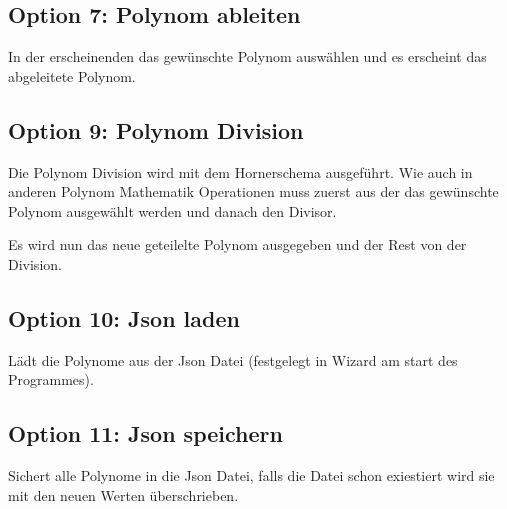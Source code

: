\documentclass[letterpaper,10pt,ngerman]{sphinxmanual}
\begin{document}
\subsection{Option 7: Polynom ableiten}
\label{menu:option-7-polynom-ableiten}
\begin{DUlineblock}{0em}
\item[] In der erscheinenden  das gewünschte Polynom auswählen und es erscheint das abgeleitete Polynom.
\end{DUlineblock}



\subsection{Option 9: Polynom Division}
\label{menu:option-9-polynom-division}
Die Polynom Division wird mit dem Hornerschema ausgeführt. Wie auch in anderen Polynom Mathematik Operationen muss
zuerst aus der  das gewünschte Polynom ausgewählt werden und danach den Divisor.

Es wird nun das neue geteilelte Polynom ausgegeben und der Rest von der Division.



\subsection{Option 10: Json laden}
\label{menu:option-10-json-laden}
Lädt die Polynome aus der Json Datei (festgelegt in Wizard am start des Programmes).



\subsection{Option 11: Json speichern}
\label{menu:option-11-json-speichern}
Sichert alle Polynome in die Json Datei, falls die Datei schon exiestiert wird sie mit den neuen Werten überschrieben.
\end{document}
